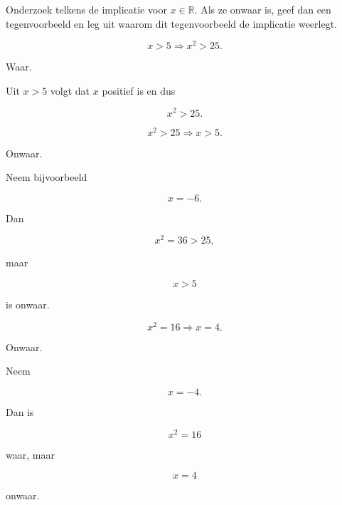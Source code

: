\documentclass{ximera}
\begin{document}
\begin{oefening}{\oefU\ESS}

Onderzoek telkens de implicatie voor $x\in\mathbb{R}$.
Als ze onwaar is, geef dan een tegenvoorbeeld en leg uit waarom dit
tegenvoorbeeld de implicatie weerlegt.

\begin{question}

\[
x>5\Rightarrow x^2>25.
\]

\begin{oplossing}

Waar.

Uit $x>5$ volgt dat $x$ positief is en dus

\[
x^2>25.
\]

\end{oplossing}

\end{question}


\begin{question}

\[
x^2>25\Rightarrow x>5.
\]

\begin{oplossing}

Onwaar.

Neem bijvoorbeeld

\[
x=-6.
\]

Dan

\[
x^2=36>25,
\]

maar

\[
x>5
\]

is onwaar.

\end{oplossing}

\end{question}


\begin{question}

\[
x^2=16\Rightarrow x=4.
\]

\begin{oplossing}

Onwaar.

Neem

\[
x=-4.
\]

Dan is

\[
x^2=16
\]

waar, maar

\[
x=4
\]

onwaar.

\end{oplossing}


\end{question}
\end{oefening}
\end{document}
